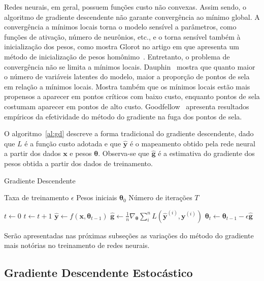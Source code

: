 Redes neurais, em geral, possuem funções custo não convexas. Assim sendo, o algoritmo de gradiente descendente não garante convergência ao mínimo global. A convergência a mínimos locais torna o modelo sensível a parâmetros, como funções de ativação, número de neurônios, etc., e o torna sensível também à inicialização dos pesos, como mostra Glorot no artigo em que apresenta um método de inicialização de pesos homônimo~\cite{glorot10}. Entretanto, o problema de convergência não se limita a mínimos locais. Dauphin~\cite{dauphin14} mostra que quanto maior o número de variáveis latentes do modelo, maior a proporção de pontos de sela em relação a mínimos locais. Mostra também que os mínimos locais estão mais propensos a aparecer em pontos críticos com baixo custo, enquanto pontos de sela costumam aparecer em pontos de alto custo. Goodfellow~\cite{goodfellow14} apresenta resultados empíricos da efetividade do método do gradiente na fuga dos pontos de sela.

O algoritmo~\ref{al:gd} descreve a forma tradicional do gradiente descendente, dado que $L$ é a função custo adotada e que $\mathbf{\hat{y}}$ é o mapeamento obtido pela rede neural a partir dos dados $\mathbf{x}$ e pesos $\boldsymbol{\theta}$. Observa-se que $\mathbf{\hat{g}}$ é a estimativa do gradiente dos pesos obtida a partir dos dados de treinamento.

\begin{algorithm}
    \caption{Gradiente Descendente}
    \label{al:gd}
    \begin{algorithmic}
        \Require Taxa de treinamento $\epsilon$
        \Require Pesos iniciais $\boldsymbol{\theta}_{0}$
        \Require Número de iterações $T$

        \State $t \gets 0$
            \State $t \gets t + 1$
            \State $\mathbf{\hat{y}} \gets f(\mathbf{x}, \boldsymbol{\theta}_{t-1})$
            \State $\mathbf{\hat{g}} \gets \frac{1}{n} \nabla_{\boldsymbol{\theta}} \sum_i^n L(\mathbf{\hat{y}}^{(i)}, \mathbf{y}^{(i)})$
            \State $\boldsymbol{\theta}_{t} \gets \boldsymbol{\theta}_{t-1} - \epsilon \mathbf{\hat{g}}$
        \EndWhile
    \end{algorithmic}
\end{algorithm}

Serão apresentadas nas próximas subseções as variações do método do gradiente mais notórias no treinamento de redes neurais.

\subsection{Gradiente Descendente Estocástico}

